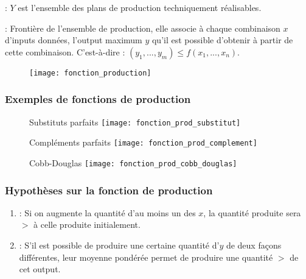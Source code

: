  : $Y$ est l'ensemble des plans de production techniquement réalisables.

 : Frontière de l'ensemble de production, elle associe à chaque combinaison $x$ d'inputs données, l'output maximum $y$ qu'il est possible d'obtenir à partir de cette combinaison. C'est-à-dire : $(y_1, ..., y_m) \leq f(x_1, ..., x_n)$.

\begin{figure}[H]
	\centering
	\texttt{[image: fonction\_production]}
\end{figure}

\subsubsection{Exemples de fonctions de production}


\begin{minipage}{0.33\textwidth}
	\begin{figure}[H]
		\centering
		Substituts parfaits
		\texttt{[image: fonction\_prod\_substitut]}
	\end{figure}
\end{minipage}
\begin{minipage}{0.33\textwidth}
	\begin{figure}[H]
		\centering
		Compléments parfaits
		\texttt{[image: fonction\_prod\_complement]}
	\end{figure}
\end{minipage}
\begin{minipage}{0.33\textwidth}
	\begin{figure}[H]
		\centering
		Cobb-Douglas
		\texttt{[image: fonction\_prod\_cobb\_douglas]}
	\end{figure}
\end{minipage}

\subsubsection{Hypothèses sur la fonction de production}

\begin{enumerate}
\item {} : Si on augmente la quantité d'au moins un des $x$, la quantité produite sera $>$ à celle produite initialement.
\item {} : S'il est possible de produire une certaine quantité d'$y$ de deux façons différentes, leur moyenne pondérée permet de produire une quantité $>$ de cet output.
\end{enumerate}

